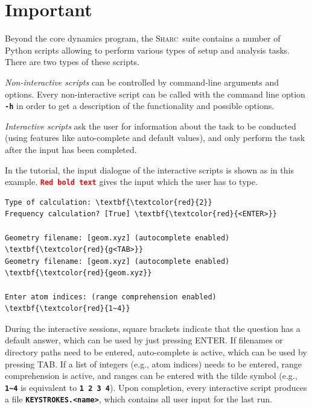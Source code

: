\documentclass[a4paper,11pt,DIV=15,openany]{scrbook}
\newcommand{\sharc}{\textsc{Sharc}}
\newcommand{\ttt}[1]{\textbf{\texttt{#1}}}
\begin{document}
\section{Important}

Beyond the core dynamics program, the \sharc\ suite contains a number of Python scripts allowing to perform various types of setup and analysis tasks. 
There are two types of these scripts.

\emph{Non-interactive scripts} can be controlled by command-line arguments and options. 
Every non-interactive script can be called with the command line option \ttt{-h} in order to get a description of the functionality and possible options.

\emph{Interactive scripts} ask the user for information about the task to be conducted (using features like auto-complete and default values), and only perform the task after the input has been completed. 

In the tutorial, the input dialogue of the interactive scripts is shown as in this example. 
\texttt{\textbf{\textcolor{red}{Red bold text}}} gives the input which the user has to type. 
\begin{oframed}
\footnotesize\begin{Verbatim}[commandchars=\\\{\}]
Type of calculation: \textbf{\textcolor{red}{2}}
Frequency calculation? [True] \textbf{\textcolor{red}{<ENTER>}}

Geometry filename: [geom.xyz] (autocomplete enabled) \textbf{\textcolor{red}{g<TAB>}}
Geometry filename: [geom.xyz] (autocomplete enabled) \textbf{\textcolor{red}{geom.xyz}}

Enter atom indices: (range comprehension enabled) \textbf{\textcolor{red}{1~4}}
\end{Verbatim}
\end{oframed}

\normalsize
During the interactive sessions, square brackets indicate that the question has a default answer, which can be used by just pressing ENTER. 
If filenames or directory paths need to be entered, auto-complete is active, which can be used by pressing TAB. 
If a list of integers (e.g., atom indices) needs to be entered, range comprehension is active, and ranges can be entered with the tilde symbol (e.g., \ttt{1\textasciitilde 4} is equivalent to \ttt{1 2 3 4}).
Upon completion, every interactive script produces a file \ttt{KEYSTROKES.<name>}, which contains all user input for the last run.
\end{document}
